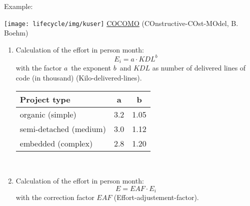 \newslide
Example:%

\texttt{[image: lifecycle/img/kuser]}
\newpage
\underline{COCOMO} (COnstructive-COst-MOdel, B. Boehm)
\begin{enumerate}
\item Calculation of the effort in person month:
\begin{equation}
 E_i = a \cdot KDL^b
\end{equation}
with the factor $a$\, the exponent $b$\
and $KDL$ as number of delivered lines of code (in thousand)
(Kilo-delivered-lines).\vspace{0.8cm}\\
\begin{tabular}{|l|cc|}\hline
Project type & a & b \\ \hline
organic (simple) & 3.2 & 1.05 \\
semi-detached (medium) & 3.0 & 1.12 \\
embedded (complex) & 2.8 & 1.20 \\ \hline
\end{tabular}\vspace{0.8cm}\\
\item Calculation of the effort in person month:
\begin{equation}
E = EAF \cdot E_i
\end{equation}
with the correction factor $EAF$ (Effort-adjustement-factor).
\end{enumerate}
